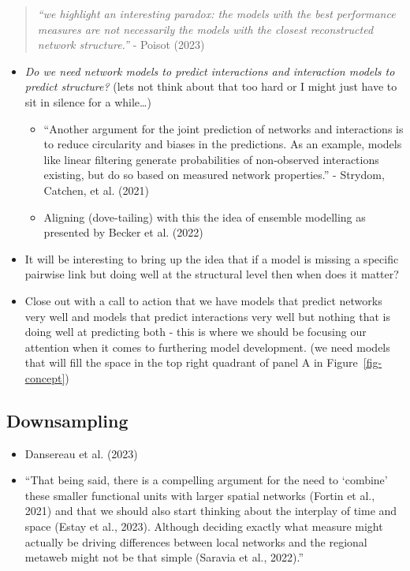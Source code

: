 \documentclass[
]{article}
\begin{document}
\begin{quote}
\emph{``we highlight an interesting paradox: the models with the best
performance measures are not necessarily the models with the closest
reconstructed network structure.''} - Poisot (2023)
\end{quote}

\begin{itemize}
\item
  \emph{Do we need network models to predict interactions and
  interaction models to predict structure?} (lets not think about that
  too hard or I might just have to sit in silence for a while\ldots)

  \begin{itemize}
  \item
    ``Another argument for the joint prediction of networks and
    interactions is to reduce circularity and biases in the predictions.
    As an example, models like linear filtering generate probabilities
    of non-observed interactions existing, but do so based on measured
    network properties.'' - Strydom, Catchen, et al. (2021)
  \item
    Aligning (dove-tailing) with this the idea of ensemble modelling as
    presented by Becker et al. (2022)
  \end{itemize}
\item
  It will be interesting to bring up the idea that if a model is missing
  a specific pairwise link but doing well at the structural level then
  when does it matter?
\item
  Close out with a call to action that we have models that predict
  networks very well and models that predict interactions very well but
  nothing that is doing well at predicting both - this is where we
  should be focusing our attention when it comes to furthering model
  development. (we need models that will fill the space in the top right
  quadrant of panel A in Figure~\ref{fig-concept})
\end{itemize}

\subsection{Downsampling}\label{downsampling}

\begin{itemize}
\item
  Dansereau et al. (2023)
\item
  ``That being said, there is a compelling argument for the need to
  `combine' these smaller functional units with larger spatial networks
  (Fortin et al., 2021) and that we should also start thinking about the
  interplay of time and space (Estay et al., 2023). Although deciding
  exactly what measure might actually be driving differences between
  local networks and the regional metaweb might not be that simple
  (Saravia et al., 2022).''
\end{itemize}
\end{document}
